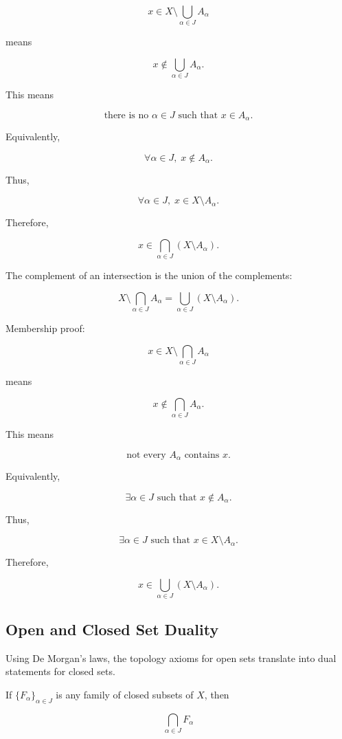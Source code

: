 \documentclass{article}
\begin{document}
	$$
	x\in X\setminus\bigcup_{\alpha\in J}A_\alpha
	$$
	
	means
	
	$$
	x\notin\bigcup_{\alpha\in J}A_\alpha.
	$$
	
	This means
	
	$$
	\text{there is no }\alpha\in J\text{ such that }x\in A_\alpha.
	$$
	
	Equivalently,
	
	$$
	\forall \alpha\in J,\; x\notin A_\alpha.
	$$
	
	Thus,
	
	$$
	\forall \alpha\in J,\; x\in X\setminus A_\alpha.
	$$
	
	Therefore,
	
	$$
	x\in\bigcap_{\alpha\in J}(X\setminus A_\alpha).
	$$
	
	The complement of an intersection is the union of the complements:
	
	$$
	X\setminus\bigcap_{\alpha\in J}A_\alpha
	=
	\bigcup_{\alpha\in J}(X\setminus A_\alpha).
	$$
	
	Membership proof:
	
	$$
	x\in X\setminus\bigcap_{\alpha\in J}A_\alpha
	$$
	
	means
	
	$$
	x\notin\bigcap_{\alpha\in J}A_\alpha.
	$$
	
	This means
	
	$$
	\text{not every }A_\alpha\text{ contains }x.
	$$
	
	Equivalently,
	
	$$
	\exists \alpha\in J\text{ such that }x\notin A_\alpha.
	$$
	
	Thus,
	
	$$
	\exists \alpha\in J\text{ such that }x\in X\setminus A_\alpha.
	$$
	
	Therefore,
	
	$$
	x\in\bigcup_{\alpha\in J}(X\setminus A_\alpha).
	$$
	
	\subsection{Open and Closed Set Duality}
	
	Using De Morgan's laws, the topology axioms for open sets translate into dual statements for closed sets.
	
	If \(\{F_\alpha\}_{\alpha\in J}\) is any family of closed subsets of \(X\), then
	
	$$
	\bigcap_{\alpha\in J}F_\alpha
	$$
	
\end{document}
